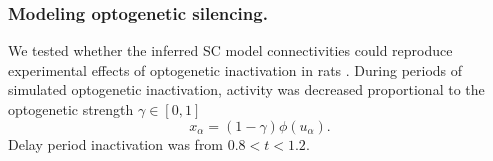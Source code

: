 \documentclass[11pt]{article}
\begin{document}
\subsubsection{Modeling optogenetic silencing.} \label{methods_sc_opto}
We tested whether the inferred SC model connectivities could reproduce experimental effects of optogenetic inactivation in rats \cite{duan2015requirement}.
During periods of simulated optogenetic inactivation, activity was decreased proportional to the optogenetic strength $\gamma \in [0, 1]$
\begin{equation}
x_\alpha = (1-\gamma)\phi(u_\alpha).
\end{equation}
Delay period inactivation was from $0.8 < t < 1.2$.
\end{document}
